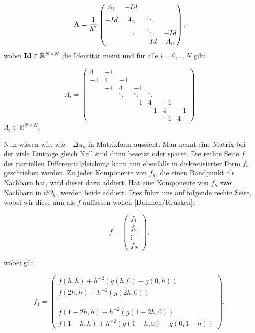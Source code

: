 \begin{equation}
{\textbf{A}} = \frac{1}{h^{2}}
\begin{pmatrix}
A_{1} & -Id \\
-Id & A_{2} & \ddots \\
 & \ddots & \ddots & -Id \\
 & & -Id & A_{n}
\end{pmatrix},\label{eq.2D Matrix}
\end{equation}
wobei ${\textbf{Id}} \in \mathbb{R}^{N \times N}$ die Identität meint und für alle $i = 0,..,N$ gilt:

\begin{equation}
A_{i} =
\begin{pmatrix}
4 & -1\\
-1 & 4 & -1\\
   & -1 & 4 & -1\\
   &    & \ddots & \ddots & \ddots\\
   &    &        & -1 & 4 & -1\\
   &    &        &    & -1 & 4 & -1\\
   &    &        &    &    & -1 & 4
\end{pmatrix}
\end{equation}
$A_{i} \in \mathbb{R}^{N \times N}$.

Nun wissen wir, wie $-\Delta u_{h}$ in Matrixform aussieht. Man nennt eine Matrix bei der viele Einträge gleich Null sind dünn besetzt oder sparse. Die rechte Seite $f$ der partiellen Differentialgleichung kann nun ebenfalls in diskretisierter Form $f_{h}$ geschrieben werden. Zu jeder Komponente von $f_{h}$, die einen Randpunkt als Nachbarn hat, wird dieser dazu addiert. Hat eine Komponente von $f_{h}$ zwei Nachbarn in $\partial \Omega_{h}$, werden beide addiert. Dies führt uns auf folgende rechte Seite, wobei wir diese nun als $f$ auffassen wollen [Dahmen/Reusken]:

\begin{equation}
f =
\begin{pmatrix}
f_{1} \\ f_{2} \\ \vdots \\ f_{N}
\end{pmatrix},
\end{equation}

wobei gilt

\begin{equation}
f_{1} = 
\begin{pmatrix}
f(h,h) + h^{-2}(g(h,0)+g(0,h)) \\
f(2h,h) + h^{-2}(g(2h,0)) \\
\vdots \\
f(1-2h,h) + h^{-2}(g(1-2h,0)) \\
f(1-h,h) + h^{-2}(g(1-h,0)+g(0,1-h))
\end{pmatrix},
\end{equation}

